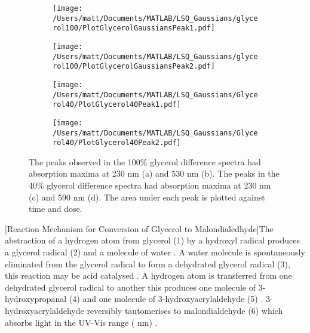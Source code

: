 \begin{figure}[!htbp]
\centering
\begin{subfigure}{.5\textwidth}
  \centering
  \texttt{[image: /Users/matt/Documents/MATLAB/LSQ\_Gaussians/glycerol100/PlotGlycerolGaussiansPeak1.pdf]}
  \caption{}
  \label{fig:glycerol100_220nm}
\end{subfigure}%
\begin{subfigure}{.5\textwidth}
  \centering
  \texttt{[image: /Users/matt/Documents/MATLAB/LSQ\_Gaussians/glycerol100/PlotGlycerolGaussiansPeak2.pdf]}
  \caption{}
  \label{fig:glycerol_530nm}
\end{subfigure}
\begin{subfigure}{.5\textwidth}
  \centering
  \texttt{[image: /Users/matt/Documents/MATLAB/LSQ\_Gaussians/Glycerol40/PlotGlycerol40Peak1.pdf]}
  \caption{}
  \label{fig:glycerol40_220nm}
\end{subfigure}%
\begin{subfigure}{.5\textwidth}
  \centering
  \texttt{[image: /Users/matt/Documents/MATLAB/LSQ\_Gaussians/Glycerol40/PlotGlycerol40Peak2.pdf]}
  \caption{}
  \label{fig:glycerol40_590nm}
\end{subfigure}
\caption[]{The peaks observed in the 100\% glycerol difference spectra had absorption maxima at 230 nm (a) and 530 nm (b). The peaks in the 40\% glycerol difference spectra had absorption maxima at 230 nm (c) and 590 nm (d). The area under each peak is plotted against time and dose.}
\end{figure}
% 

\begin{minipage}[!htp]{\linewidth}
	[Reaction Mechanism for Conversion of Glycerol to Malondialedhyde]{The abstraction of a hydrogen atom from glycerol (1) by a hydroxyl radical produces a glycerol radical (2) and a molecule of water \cite{Steenken1974}. A water molecule is spontaneously eliminated from the glycerol radical to form a dehydrated glycerol radical (3), this reaction may be acid catalysed \cite{Steenken1974}. A hydrogen atom is transferred from one dehydrated glycerol radical to another this produces one molecule of 3-hydroxypropanal (4) and one molecule of 3-hydroxyacrylaldehyde (5) \cite{Ivanova2009}. 3-hydroxyacrylaldehyde reversibly tautomerises to malondialdehyde (6) which absorbs light in the UV-Vis range ( nm) \cite{Ivanova2009}. \label{fig:MDA_mechanism}}	
\end{minipage}
\FloatBarrier
\clearpage
